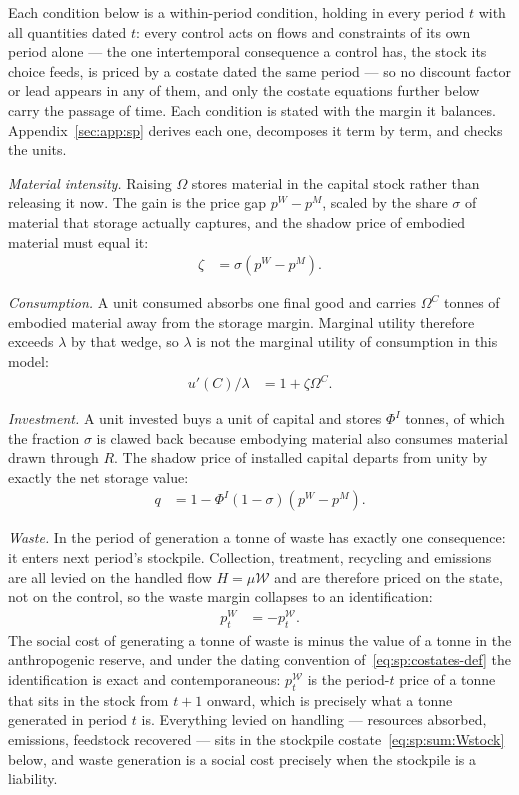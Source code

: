  Each condition below is a within-period condition, holding in every period $t$ with all quantities dated $t$: every control acts on flows and constraints of its own period alone --- the one intertemporal consequence a control has, the stock its choice feeds, is priced by a costate dated the same period --- so no discount factor or lead appears in any of them, and only the costate equations further below carry the passage of time. Each condition is stated with the margin it balances. Appendix~\ref{sec:app:sp} derives each one, decomposes it term by term, and checks the units.

\emph{Material intensity.} Raising $\Omega$ stores material in the capital stock rather than releasing it now. The gain is the price gap $p^W-p^M$, scaled by the share $\sigma$ of material that storage actually captures, and the shadow price of embodied material must equal it:
\begin{align}
\zeta &= \sigma\left(p^W-p^M\right).
\label{eq:sp:sum:Omega}
\end{align}

\emph{Consumption.} A unit consumed absorbs one final good and carries $\Omega^C$ tonnes of embodied material away from the storage margin. Marginal utility therefore exceeds $\lambda$ by that wedge, so $\lambda$ is not the marginal utility of consumption in this model:
\begin{align}
u'\left(C\right)/\lambda &= 1+\zeta\Omega^C .
\label{eq:sp:sum:C}
\end{align}

\emph{Investment.} A unit invested buys a unit of capital and stores $\Phi^I$ tonnes, of which the fraction $\sigma$ is clawed back because embodying material also consumes material drawn through $R$. The shadow price of installed capital departs from unity by exactly the net storage value:
\begin{align}
q &= 1-\Phi^I\left(1-\sigma\right)\left(p^W-p^M\right).
\label{eq:sp:sum:I}
\end{align}

\emph{Waste.} In the period of generation a tonne of waste has exactly one consequence: it enters next period's stockpile. Collection, treatment, recycling and emissions are all levied on the handled flow $H=\mu\mathcal W$ and are therefore priced on the state, not on the control, so the waste margin collapses to an identification:
\begin{align}
p^W_t &= -p^{\mathcal W}_t .
\label{eq:sp:sum:W}
\end{align}
The social cost of generating a tonne of waste is minus the value of a tonne in the anthropogenic reserve, and under the dating convention of~\eqref{eq:sp:costates-def} the identification is exact and contemporaneous: $p^{\mathcal W}_t$ is the period-$t$ price of a tonne that sits in the stock from $t+1$ onward, which is precisely what a tonne generated in period $t$ is. Everything levied on handling --- resources absorbed, emissions, feedstock recovered --- sits in the stockpile costate~\eqref{eq:sp:sum:Wstock} below, and waste generation is a social cost precisely when the stockpile is a liability.

